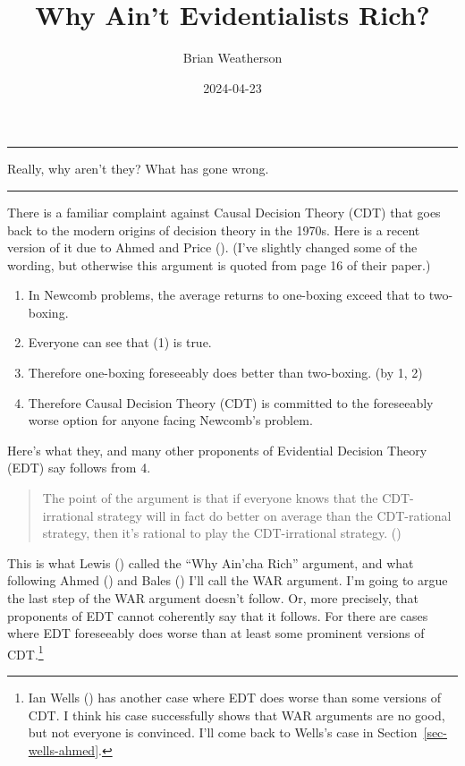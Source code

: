 \documentclass[
  10pt,
  letterpaper,
  DIV=11,
  numbers=noendperiod,
  twoside]{scrartcl}
\title{Why Ain't Evidentialists Rich?}
\author{Brian Weatherson}
\date{2024-04-23}
\providecommand{\tightlist}{%
  \setlength{\itemsep}{0pt}\setlength{\parskip}{0pt}}\usepackage{longtable,booktabs,array}
\renewenvironment{abstract}
 {\quotation\small\noindent\rule{\linewidth}{.5pt}\par\smallskip}
 {\par\noindent\rule{\linewidth}{.5pt}\endquotation}
\begin{document}
\maketitle
\begin{abstract}
Really, why aren't they? What has gone wrong.
\end{abstract}

\noindent There is a familiar complaint against Causal Decision Theory
(CDT) that goes back to the modern origins of decision theory in the
1970s. Here is a recent version of it due to Ahmed and Price
(). (I've slightly changed some of
the wording, but otherwise this argument is quoted from page 16 of their
paper.)

\begin{enumerate}
\def\labelenumi{\arabic{enumi}.}
\tightlist
\item
  In Newcomb problems, the average returns to one-boxing exceed that to
  two-boxing.
\item
  Everyone can see that (1) is true.
\item
  Therefore one-boxing foreseeably does better than two-boxing. (by 1,
  2)
\item
  Therefore Causal Decision Theory (CDT) is committed to the foreseeably
  worse option for anyone facing Newcomb's problem.
\end{enumerate}

Here's what they, and many other proponents of Evidential Decision
Theory (EDT) say follows from 4.

\begin{quote}
The point of the argument is that if everyone knows that the
CDT-irrational strategy will in fact do better on average than the
CDT-rational strategy, then it's rational to play the CDT-irrational
strategy. ()
\end{quote}

This is what Lewis () called the ``Why
Ain'cha Rich'' argument, and what following Ahmed
() and Bales
() I'll call the WAR argument. I'm going
to argue the last step of the WAR argument doesn't follow. Or, more
precisely, that proponents of EDT cannot coherently say that it follows.
For there are cases where EDT foreseeably does worse than at least some
prominent versions of CDT.\footnote{Ian Wells
  () has another case where EDT does worse
  than some versions of CDT. I think his case successfully shows that
  WAR arguments are no good, but not everyone is convinced. I'll come
  back to Wells's case in Section~\ref{sec-wells-ahmed}.}
\end{document}
